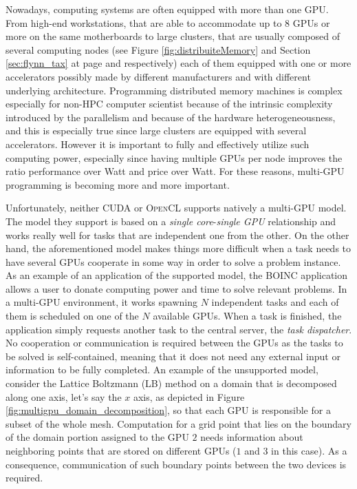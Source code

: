 Nowadays, computing systems are often equipped with more than one GPU.
From high-end workstations, that are able to accommodate up to 8 GPUs or more on the same motherboards to large clusters, that are usually composed of several computing nodes (see Figure \ref{fig:distribuiteMemory} and Section \ref{sec:flynn_tax} at page \pageref{fig:distribuiteMemory} and \pageref{sec:flynn_tax} respectively) each of them equipped with one or more accelerators possibly made by different manufacturers and with different underlying architecture.
Programming distributed memory machines is complex especially for non-HPC computer scientist because of the intrinsic complexity introduced by the parallelism and because of the hardware heterogeneousness, and this is especially true since large clusters are equipped with several accelerators.
However it is important to fully and effectively utilize such computing power, especially since having multiple GPUs per node improves the ratio performance over Watt and price over Watt.
For these reasons, multi-GPU programming is becoming more and more important.

Unfortunately, neither \textsc{CUDA} or \textsc{OpenCL} supports natively a multi-GPU model.
The model they support is based on a \textit{single core}-\textit{single GPU} relationship and works really well for tasks that are independent one from the other.
On the other hand, the aforementioned model makes things more difficult when a task needs to have several GPUs cooperate in some way in order to solve a problem instance.
As an example of an application of the supported model, the \textsc{BOINC} application \cite{anderson:2004} allows a user to donate computing power and time to solve relevant problems.
In a multi-GPU environment, it works spawning $N$ independent tasks and each of them is scheduled on one of the $N$ available GPUs.
When a task is finished, the application simply requests another task to the central server, the \textit{task dispatcher}.
No cooperation or communication is required between the GPUs as the tasks to be solved is self-contained, meaning that it does not need any external input or information to be fully completed.
An example of the unsupported model, consider the Lattice Boltzmann (LB) \cite{McNamara&Zanetti-1988} \cite{Aidun2010439} \cite{Higuera&Jimenez-1989} method on a domain that is decomposed along one axis, let's say the $x$ axis, as depicted in Figure \ref{fig:multigpu_domain_decomposition}, so that each GPU is responsible for a subset of the whole mesh.
Computation for a grid point that lies on the boundary of the domain portion assigned to the GPU $2$ needs information about neighboring points that are stored on different GPUs ($1$ and $3$ in this case). As a consequence, 
communication of such boundary points between the two devices is required.

